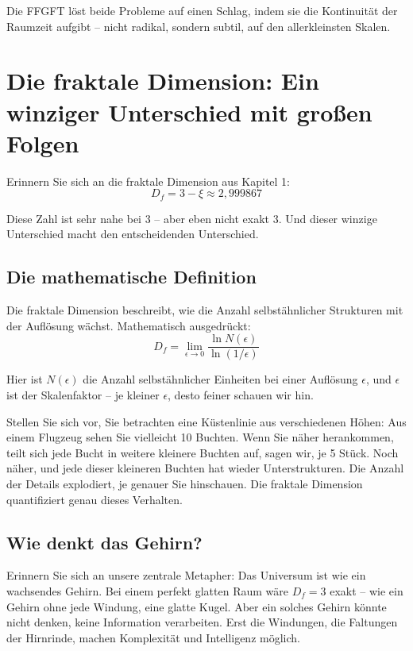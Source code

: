 Die FFGFT löst beide Probleme auf einen Schlag, indem sie die Kontinuität der Raumzeit aufgibt – nicht radikal, sondern subtil, auf den allerkleinsten Skalen.

\section{Die fraktale Dimension: Ein winziger Unterschied mit großen Folgen}

Erinnern Sie sich an die fraktale Dimension aus Kapitel 1:
\begin{equation}
D_f = 3 - \xi \approx 2,999867
\end{equation}

Diese Zahl ist sehr nahe bei 3 – aber eben nicht exakt 3. Und dieser winzige Unterschied macht den entscheidenden Unterschied.

\subsection{Die mathematische Definition}

Die fraktale Dimension beschreibt, wie die Anzahl selbstähnlicher Strukturen mit der Auflösung wächst. Mathematisch ausgedrückt:
\begin{equation}
D_f = \lim_{\epsilon \to 0} \frac{\ln N(\epsilon)}{\ln(1/\epsilon)}
\end{equation}

Hier ist $N(\epsilon)$ die Anzahl selbstähnlicher Einheiten bei einer Auflösung $\epsilon$, und $\epsilon$ ist der Skalenfaktor – je kleiner $\epsilon$, desto feiner schauen wir hin.

Stellen Sie sich vor, Sie betrachten eine Küstenlinie aus verschiedenen Höhen: Aus einem Flugzeug sehen Sie vielleicht 10 Buchten. Wenn Sie näher herankommen, teilt sich jede Bucht in weitere kleinere Buchten auf, sagen wir, je 5 Stück. Noch näher, und jede dieser kleineren Buchten hat wieder Unterstrukturen. Die Anzahl der Details explodiert, je genauer Sie hinschauen. Die fraktale Dimension quantifiziert genau dieses Verhalten.

\subsection{Wie denkt das Gehirn?}

Erinnern Sie sich an unsere zentrale Metapher: Das Universum ist wie ein wachsendes Gehirn. Bei einem perfekt glatten Raum wäre $D_f = 3$ exakt – wie ein Gehirn ohne jede Windung, eine glatte Kugel. Aber ein solches Gehirn könnte nicht denken, keine Information verarbeiten. Erst die Windungen, die Faltungen der Hirnrinde, machen Komplexität und Intelligenz möglich.

